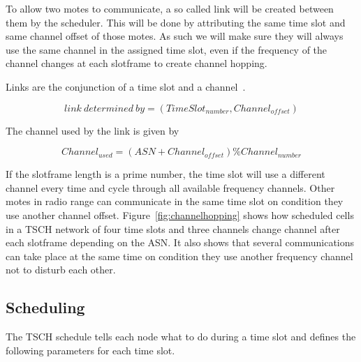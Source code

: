 To allow two motes to communicate, a so called link will be created between
them by the scheduler.
This will be done by attributing the same time slot and  same channel offset
of those motes.
As such we will make sure they will always use the same channel in the assigned
time slot, even if the frequency of the channel changes at each slotframe to
create channel hopping.

Links are the conjunction of a time slot and a channel~\cite{Chen2013PerformanceAO}.

\begin{equation}
  \label{eq:links}
  link~determined~by = (TimeSlot_{number}, Channel_{offset})
\end{equation}

%

The channel used by the link is given by

\begin{equation}
  \label{eq:channel}
  Channel_{used} = (ASN + Channel_{offset}) \% Channel_{number}
\end{equation}

If the slotframe length is a prime number,
the time slot will use a different channel every time and cycle through all
available frequency channels.
Other motes in radio range can communicate in the same time slot on condition
they use another channel offset.
Figure~\ref{fig:channelhopping} shows how scheduled cells in a TSCH network of
four time slots and three channels change channel after each slotframe depending
on the ASN. It also shows that several communications can take place at the same
time on condition they use another frequency channel not to disturb each other.



\subsection{Scheduling\label{section:tschscheduling}}

The TSCH schedule tells each node what to do during a time slot and defines the
following parameters for each time slot.

